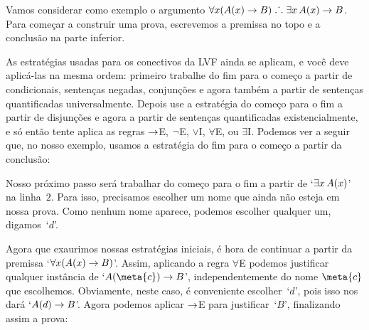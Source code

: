 Vamos considerar como exemplo o argumento $\forall x(\mathord{A}(x) \rightarrow B) \mathrel{\ldotp\dot{}\,\ldotp} \exists x\,\mathord{A}(x) \rightarrow B$. Para começar a construir uma prova, escrevemos a premissa no topo e a conclusão na parte inferior.
\begin{fitchproof}
\ellipsesline
{}
\end{fitchproof}
As estratégias usadas para os conectivos da LVF ainda se aplicam, e você deve aplicá-las na mesma ordem: primeiro trabalhe do fim para o começo a partir de condicionais, sentenças negadas, conjunções e agora também a partir de  sentenças quantificadas universalmente. Depois use a estratégia do começo para o fim a partir de  disjunções e agora a partir de sentenças quantificadas existencialmente, e só então tente aplica as regras $\rightarrow$E, $\neg$E, $\lor$I, $\forall$E, ou $\exists$I. Podemos ver a seguir que, no nosso exemplo, usamos a estratégia do fim para o começo a partir da conclusão:
 
\begin{fitchproof}
	\open
	\ellipsesline
	\close
\end{fitchproof}
Nosso próximo passo será trabalhar do começo para o fim a partir de `$\exists x\,\mathord{A}(x)$' na linha~$2$. Para isso, precisamos escolher um nome que ainda não esteja em nossa prova. Como nenhum nome aparece, podemos escolher qualquer um, digamos~`$d$'.
\begin{fitchproof}
	\open
	\open
	\ellipsesline
	\close
	\close
\end{fitchproof}
Agora que exaurimos nossas estratégias iniciais,  é hora de continuar  a partir da premissa `$\forall x(\mathord{A}(x) \rightarrow B)$'. Assim, aplicando a regra $\forall$E podemos justificar qualquer instância de `$A(\meta{c}) \eif B$', independentemente do nome $\meta{c}$ que escolhemos. Obviamente, neste caso, é conveniente  escolher~`$d$', pois isso nos dará  `$\mathord{A}(d) \rightarrow B$'. Agora podemos aplicar $\rightarrow$E para justificar~`$B$', finalizando assim a prova:

 
\begin{fitchproof}
	\open
	\open
	\close
	\close
\end{fitchproof}

